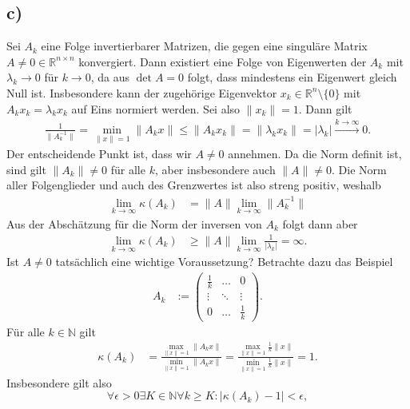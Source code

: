 \documentclass[english, parskip=full]{scrartcl}
\begin{document}
\subsection*{c)}
Sei $A_k$ eine Folge invertierbarer Matrizen, die gegen eine singuläre Matrix $A\neq 0\in\mathbb{R}^{n\times n}$ konvergiert.
Dann existiert eine Folge von Eigenwerten der $A_k$ mit $\lambda_k \rightarrow 0$ für $k\rightarrow 0$, da aus $\det A = 0$ folgt, dass mindestens ein Eigenwert gleich Null ist.
Insbesondere kann der zugehörige Eigenvektor $x_k\in\mathbb{R}^n\setminus\{0\}$ mit $A_kx_k = \lambda_k x_k$ auf Eins normiert werden.
Sei also $\|x_k\| = 1$.
Dann gilt
\begin{align}
\frac{1}{\|A_k^{-1}\|} = \min_{\|x\| = 1} \|A_kx\| \le \|A_kx_k\| = \|\lambda_kx_k\| = |\lambda_k| \overset{k\rightarrow\infty}{\longrightarrow} 0.
\end{align}
Der entscheidende Punkt ist, dass wir $A\neq 0$ annehmen.
Da die Norm definit ist, sind gilt $\|A_k\| \neq 0$ für alle $k$, aber insbesondere auch $\|A\| \neq 0$.
Die Norm aller Folgenglieder und auch des Grenzwertes ist also streng positiv, weshalb
\begin{align}
\lim_{k\rightarrow\infty} \kappa (A_k) &= \|A\| \lim_{k\rightarrow\infty} \|A_k^{-1}\| 
\end{align}
Aus der Abschätzung für die Norm der inversen von $A_k$ folgt dann aber
\begin{align}
\lim_{k\rightarrow\infty} \kappa (A_k) &\ge \|A\| \lim_{k\rightarrow \infty}\frac{1}{|\lambda_k|} = \infty.
\end{align}
Ist $A\neq 0$ tatsächlich eine wichtige Voraussetzung? 
Betrachte dazu das Beispiel 
\begin{align}
A_k &:= \begin{pmatrix}
\frac{1}{k} & \dots & 0 \\ 
\vdots & \ddots & \vdots \\ 
0 & \dots & \frac{1}{k}
\end{pmatrix}.
\end{align}
Für alle $k\in\mathbb{N}$ gilt
\begin{align}
\kappa (A_k) &= \frac{\underset{\|x\| = 1}{\max}\|A_kx\|}{\underset{\|x\| = 1}{\min}\|A_kx\|} = \frac{\underset{\|x\| = 1}{\max}\frac{1}{k}\|x\|}{\underset{\|x\| = 1}{\min}\frac{1}{k}\|x\|} = 1.
\end{align}
Insbesondere gilt also 
$$\forall\epsilon > 0\exists K\in\mathbb{N}\forall k\ge K: |\kappa(A_k) - 1| < \epsilon, $$
\end{document}
